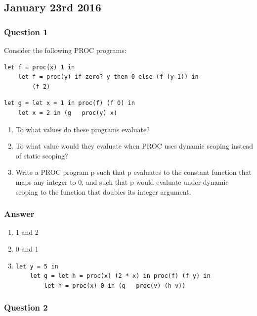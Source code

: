 \documentclass[a4paper]{article}
\begin{document}
\subsection{January 23rd 2016}

\subsubsection{Question 1}

Consider the following PROC programs:

\begin{lstlisting}[language={CPL}]
let f = proc(x) 1 in
    let f = proc(y) if zero? y then 0 else (f (y-1)) in
        (f 2)
\end{lstlisting}

\begin{lstlisting}[language={CPL}]
let g = let x = 1 in proc(f) (f 0) in
    let x = 2 in (g   proc(y) x)
\end{lstlisting}

\begin{enumerate}[label=\Alph*]
\item To what values do these programs evaluate?
\item To what value would they evaluate when PROC uses dynamic scoping instead of static scoping?
\item Write a PROC program p such that p evaluates to the constant function that maps any integer to 0, and such that p would evaluate under dynamic scoping to the function that doubles its integer argument.
\end{enumerate}

\subsubsection*{Answer}

\begin{enumerate}[label=\Alph*]
\item 1 and 2
\item 0 and 1
\item
\begin{lstlisting}[language={CPL}]
let y = 5 in
    let g = let h = proc(x) (2 * x) in proc(f) (f y) in
        let h = proc(x) 0 in (g   proc(v) (h v))
\end{lstlisting}
\end{enumerate}

\subsubsection{Question 2}
\end{document}
